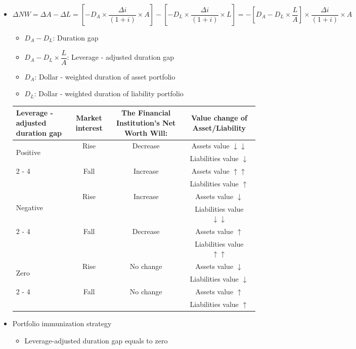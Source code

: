 \begin{itemize}
\item \(\Delta NW = \Delta A - \Delta L = \left[-D_A\times\dfrac{\Delta i}{(1 + i)}\times A\right] - \left[-D_L\times\dfrac{\Delta i}{(1 + i)}\times L\right]=-\left[D_A - D_L\times\dfrac{L}{A}\right]\times\dfrac{\Delta i}{(1 + i)}\times A\)
    \begin{itemize}
        \item \(D_A - D_L\): Duration gap
        \item  \(D_A - D_L\times\dfrac{L}{A}\): Leverage - adjusted duration gap
        \item \(D_A\): Dollar - weighted duration of asset portfolio
        \item \(D_L\): Dollar - weighted duration of liability portfolio
    \end{itemize}
    \begin{tabular}{|p{3cm}|c|c|c|}
        \hline
        Leverage - adjusted duration gap & Market interest & The Financial Institution's Net Worth Will: & Value change of Asset/Liability \\
        \hline
        \multirow{2}{*}{Positive} 
        & Rise & Decrease & Assets value $\downarrow\downarrow$ \\
        &  &  & Liabilities value $\downarrow$ \\
        \cline{2 - 4}
        & Fall & Increase & Assets value $\uparrow\uparrow$ \\
        &  &  & Liabilities value $\uparrow$ \\
        \hline
        \multirow{2}{*}{Negative} 
        & Rise & Increase & Assets value $\downarrow$ \\
        &  &  & Liabilities value $\downarrow\downarrow$ \\
        \cline{2 - 4}
        & Fall & Decrease & Assets value $\uparrow$ \\
        &  &  & Liabilities value $\uparrow\uparrow$ \\
        \hline
        \multirow{2}{*}{Zero} 
        & Rise & No change & Assets value $\downarrow$ \\
        &  &  & Liabilities value $\downarrow$ \\
        \cline{2 - 4}
        & Fall & No change & Assets value $\uparrow$ \\
        &  &  & Liabilities value $\uparrow$ \\
        \hline
        \end{tabular}
\item Portfolio immunization strategy
    \begin{itemize}
    \item Leverage-adjusted duration gap equals to zero
    \end{itemize}
    

\end{itemize}
